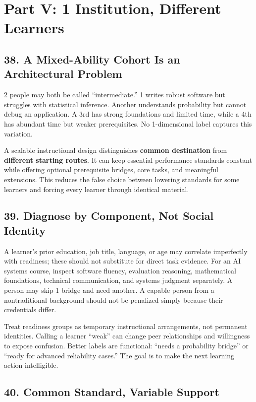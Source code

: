 \section*{Part V: 1 Institution, Different Learners}

\subsection*{38. A Mixed-Ability Cohort Is an Architectural Problem}

2 people may both be called ``intermediate.'' 1 writes robust software but struggles with statistical inference. Another understands probability but cannot debug an application. A 3rd has strong foundations and limited time, while a 4th has abundant time but weaker prerequisites. No 1-dimensional label captures this variation.

A scalable instructional design distinguishes \textbf{common destination} from \textbf{different starting routes}. It can keep essential performance standards constant while offering optional prerequisite bridges, core tasks, and meaningful extensions. This reduces the false choice between lowering standards for some learners and forcing every learner through identical material.

\subsection*{39. Diagnose by Component, Not Social Identity}

A learner's prior education, job title, language, or age may correlate imperfectly with readiness; these should not substitute for direct task evidence. For an AI systems course, inspect software fluency, evaluation reasoning, mathematical foundations, technical communication, and systems judgment separately. A person may skip 1 bridge and need another. A capable person from a nontraditional background should not be penalized simply because their credentials differ.

Treat readiness groups as temporary instructional arrangements, not permanent identities. Calling a learner ``weak'' can change peer relationships and willingness to expose confusion. Better labels are functional: ``needs a probability bridge'' or ``ready for advanced reliability cases.'' The goal is to make the next learning action intelligible.

\subsection*{40. Common Standard, Variable Support}

